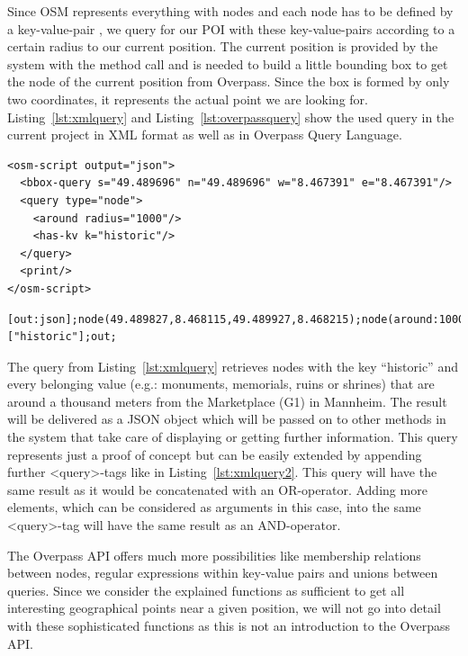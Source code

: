 \documentclass[journal]{IEEEtran}
\begin{document}
Since OSM represents everything with nodes and each node has to be defined by a key-value-pair \cite{osmfeature}, we query for our POI with these key-value-pairs according to a certain radius to our current position. 
The current position is provided by the system with the method call and is needed to build a little bounding box to get the node of the current position from Overpass. Since the box is formed by only two coordinates, it represents the actual point we are looking for. Listing~\ref{lst:xmlquery} and Listing~\ref{lst:overpassquery} show the used query in the current project in XML format as well as in Overpass Query Language.

\begin{lstlisting}[caption={Overpass~query~in~XML~format},label={lst:xmlquery}]
<osm-script output="json">
  <bbox-query s="49.489696" n="49.489696" w="8.467391" e="8.467391"/>
  <query type="node">
    <around radius="1000"/>
    <has-kv k="historic"/>
  </query>
  <print/>
</osm-script>
\end{lstlisting}

\begin{lstlisting}[caption={Overpass~query~in~Overpass~Query~Language},label={lst:overpassquery}]
[out:json];node(49.489827,8.468115,49.489927,8.468215);node(around:1000)["historic"];out;
\end{lstlisting}


The query from Listing~\ref{lst:xmlquery} retrieves nodes with the key ``historic'' and every belonging value (e.g.: monuments, memorials, ruins or shrines) that are around a thousand meters from the Marketplace (G1) in Mannheim. The result will be delivered as a JSON object which will be passed on to other methods in the system that take care of displaying or getting further information. This query represents just a proof of concept but can be easily extended by appending further \textless query\textgreater-tags like in Listing~\ref{lst:xmlquery2}. This query will have the same result as it would be concatenated with an OR-operator. Adding more elements, which can be considered as arguments in this case, into the same \textless query\textgreater-tag will have the same result as an AND-operator.

The Overpass API offers much more possibilities like membership relations between nodes, regular expressions within key-value pairs and unions between queries. Since we consider the explained functions as sufficient to get all interesting geographical points near a given position, we will not go into detail with these sophisticated functions as this is not an introduction to the Overpass API.
\end{document}
